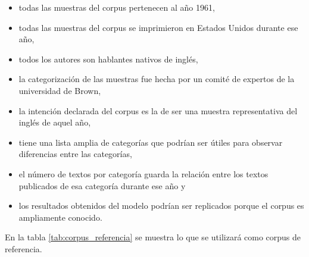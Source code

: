 \documentclass[12pt,letterpaper,twoside]{article}
\begin{document}
\begin{itemize}
\item todas las muestras del corpus pertenecen al año 1961,
\item todas las muestras del corpus se imprimieron en Estados Unidos durante ese año,
\item todos los autores son hablantes nativos de inglés,
\item la categorización de las muestras fue hecha por un comité de expertos de la universidad de Brown,
\item la intención declarada del corpus es la de ser una muestra representativa del inglés de aquel año,
\item tiene una lista amplia de categorías que podrían ser útiles para observar diferencias entre las categorías,
\item el número de textos por categoría guarda la relación entre los textos publicados de esa categoría durante ese año y
\item los resultados obtenidos del modelo podrían ser replicados porque el corpus es ampliamente conocido.
\end{itemize}

En la tabla \ref{tab:corpus_referencia} se muestra lo que se
utilizará como corpus de referencia.
\end{document}
